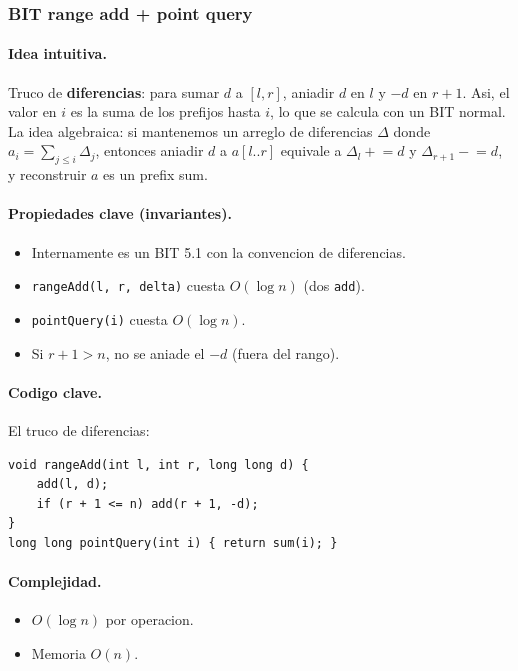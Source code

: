 \subsubsection{BIT range add + point query}

\paragraph{Idea intuitiva.}
Truco de \textbf{diferencias}: para sumar $d$ a $[l, r]$, aniadir $d$ en $l$ y $-d$ en $r+1$. Asi, el valor en $i$ es la suma de los prefijos hasta $i$, lo que se calcula con un BIT normal. La idea algebraica: si mantenemos un arreglo de diferencias $\Delta$ donde $a_i = \sum_{j \le i} \Delta_j$, entonces aniadir $d$ a $a[l..r]$ equivale a $\Delta_l \mathrel{+}= d$ y $\Delta_{r+1} \mathrel{-}= d$, y reconstruir $a$ es un prefix sum.

\paragraph{Propiedades clave (invariantes).}
\begin{itemize}\setlength\itemsep{0pt}
	\item Internamente es un BIT 5.1 con la convencion de diferencias.
	\item \texttt{rangeAdd(l, r, delta)} cuesta $O(\log n)$ (dos \texttt{add}).
	\item \texttt{pointQuery(i)} cuesta $O(\log n)$.
	\item Si $r+1 > n$, no se aniade el $-d$ (fuera del rango).
\end{itemize}

\paragraph{Codigo clave.}
El truco de diferencias:
\begin{verbatim}
void rangeAdd(int l, int r, long long d) {
    add(l, d);
    if (r + 1 <= n) add(r + 1, -d);
}
long long pointQuery(int i) { return sum(i); }
\end{verbatim}

\paragraph{Complejidad.}
\begin{itemize}\setlength\itemsep{0pt}
	\item $O(\log n)$ por operacion.
	\item Memoria $O(n)$.
\end{itemize}

